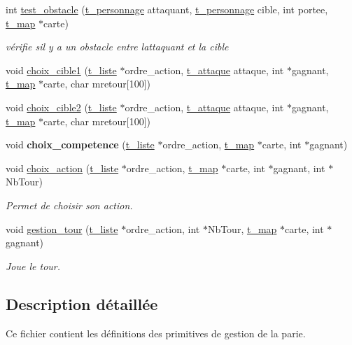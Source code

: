 \begin{DoxyCompactItemize}
\item 
int \hyperlink{a00020_a2e51ad96f1ea3d4b301c5bdae2be4160}{test\+\_\+obstacle} (\hyperlink{a00009}{t\+\_\+personnage} attaquant, \hyperlink{a00009}{t\+\_\+personnage} cible, int portee, \hyperlink{a00007}{t\+\_\+map} $\ast$carte)
\begin{DoxyCompactList}\small\item\em vérifie s\textquotesingle{}il y a un obstacle entre l\textquotesingle{}attaquant et la cible \end{DoxyCompactList}\item 
void \hyperlink{a00020_a996472c0d70de400e560b835c47820d6}{choix\+\_\+cible1} (\hyperlink{a00006}{t\+\_\+liste} $\ast$ordre\+\_\+action, \hyperlink{a00003}{t\+\_\+attaque} attaque, int $\ast$gagnant, \hyperlink{a00007}{t\+\_\+map} $\ast$carte, char mretour\mbox{[}100\mbox{]})
\item 
void \hyperlink{a00020_a0fd6a7ce433977b4c02287981e5fce42}{choix\+\_\+cible2} (\hyperlink{a00006}{t\+\_\+liste} $\ast$ordre\+\_\+action, \hyperlink{a00003}{t\+\_\+attaque} attaque, int $\ast$gagnant, \hyperlink{a00007}{t\+\_\+map} $\ast$carte, char mretour\mbox{[}100\mbox{]})
\item 
void {\bfseries choix\+\_\+competence} (\hyperlink{a00006}{t\+\_\+liste} $\ast$ordre\+\_\+action, \hyperlink{a00007}{t\+\_\+map} $\ast$carte, int $\ast$gagnant)\hypertarget{a00020_aef9e64f9c90a01e6e0464bdc5a5a0869}{}\label{a00020_aef9e64f9c90a01e6e0464bdc5a5a0869}

\item 
void \hyperlink{a00020_a466551595f49874f6d1fd43237170540}{choix\+\_\+action} (\hyperlink{a00006}{t\+\_\+liste} $\ast$ordre\+\_\+action, \hyperlink{a00007}{t\+\_\+map} $\ast$carte, int $\ast$gagnant, int $\ast$Nb\+Tour)
\begin{DoxyCompactList}\small\item\em Permet de choisir son action. \end{DoxyCompactList}\item 
void \hyperlink{a00020_aa1ae5f37296953a32a81ff410b25ab6a}{gestion\+\_\+tour} (\hyperlink{a00006}{t\+\_\+liste} $\ast$ordre\+\_\+action, int $\ast$Nb\+Tour, \hyperlink{a00007}{t\+\_\+map} $\ast$carte, int $\ast$gagnant)
\begin{DoxyCompactList}\small\item\em Joue le tour. \end{DoxyCompactList}\end{DoxyCompactItemize}


\subsection{Description détaillée}
Ce fichier contient les définitions des primitives de gestion de la parie. 

